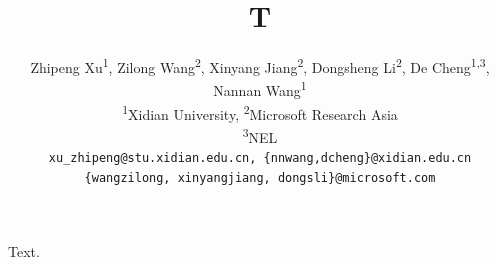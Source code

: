 \documentclass{article}
\title{T}
\author{Zhipeng Xu\textsuperscript{\rm 1}, Zilong Wang\textsuperscript{\rm 2}, Xinyang Jiang\textsuperscript{\rm 2},
Dongsheng Li\textsuperscript{\rm 2}, De Cheng\textsuperscript{\rm 1,3}, Nannan Wang\textsuperscript{\rm 1} \\
\textsuperscript{1}Xidian University,\; \textsuperscript{2}Microsoft Research Asia\; \\ \textsuperscript{3}NEL\; \\
\tt \small xu\_zhipeng@stu.xidian.edu.cn,  \{nnwang,dcheng\}@xidian.edu.cn \\
\tt \small \{wangzilong, xinyangjiang, dongsli\}@microsoft.com}
\begin{document}
\maketitle
Text.
\end{document}
